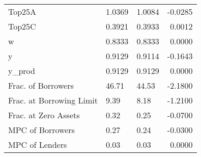 \begin{table}
\begin{tabular}{lllr}
                  Top25A &  1.0369 &   1.0084 & -0.0285 \\
                  Top25C &  0.3921 &   0.3933 &  0.0012 \\
                       w &  0.8333 &   0.8333 &  0.0000 \\
                       y &  0.9129 &   0.9114 & -0.1643 \\
                  y\_prod &  0.9129 &   0.9129 &  0.0000 \\
      Frac. of Borrowers &   46.71 &    44.53 & -2.1800 \\
Frac. at Borrowing Limit &    9.39 &     8.18 & -1.2100 \\
    Frac. at Zero Assets &    0.32 &     0.25 & -0.0700 \\
        MPC of Borrowers &    0.27 &     0.24 & -0.0300 \\
          MPC of Lenders &    0.03 &     0.03 &  0.0000 \\
\bottomrule
\end{tabular}
\end{table}
